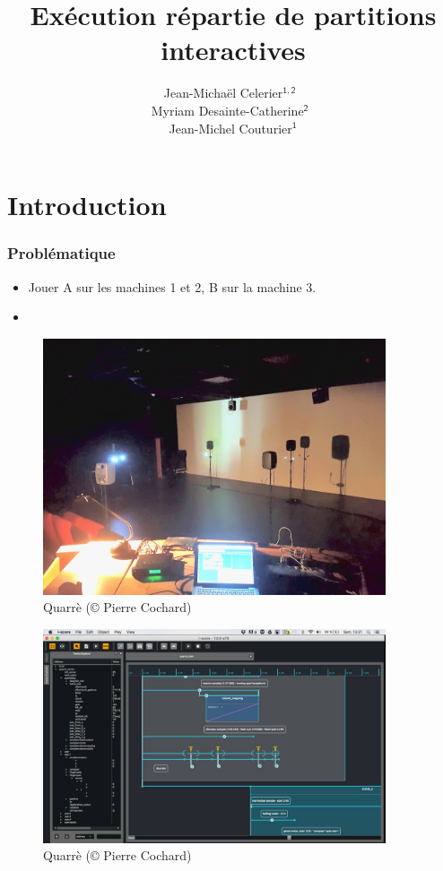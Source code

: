 \documentclass[]{beamer}
\title{Exécution répartie de partitions interactives}
\subtitle{}
\date{}
\author{Jean-Michaël Celerier$\mathsf{^{1,2}}$~\\ Myriam Desainte-Catherine$\mathsf{^{2}}$~\\ Jean-Michel Couturier$\mathsf{^{1}}$}
\institute{1. Blue Yeti --- 2. SCRIME / LaBRI}
\begin{document}
\maketitle
\begin{frame}
    \tableofcontents
\end{frame}

\section{Introduction}
\begin{frame}
    \frametitle{Problématique}
    \Large
    \begin{itemize}
        \item Jouer A  sur les machines 1 et 2, B sur la machine 3.
        \item 
    \end{itemize}
\end{frame}

\begin{frame}
    \Large
    \begin{figure}
    	\centering
    	\includegraphics[width=0.9\textwidth]{images/quarre.jpg}
    	\caption{Quarrè (© Pierre Cochard)}
    \end{figure}
\end{frame}

\begin{frame}
\Large
\begin{figure}
	\centering
	\includegraphics[width=0.9\textwidth]{images/quarre-2.jpg}
	\caption{Quarrè (© Pierre Cochard)}
\end{figure}
\end{frame}
\end{document}

